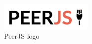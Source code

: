 \begin{figure}[H]
\centering
\includegraphics[width=0.4\textwidth]{img/logos/peerjs_logo.png}
\caption{PeerJS logo}
\label{fig:peerjs}
\end{figure}